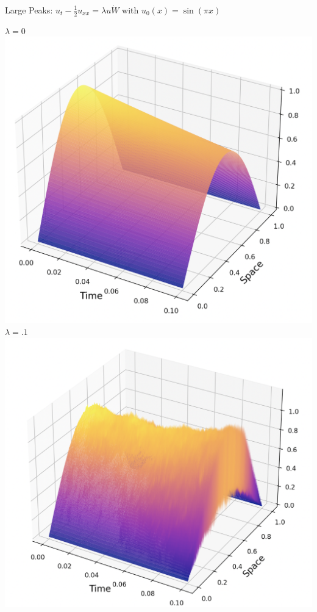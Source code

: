 \documentclass{beamer}%
\numberwithin{equation}{section}
\begin{document}
\begin{frame}{Large Peaks: $u_t - \frac{1}{2}u_{xx} = \lambda u \dot{W}$ with $u_0(x) = \sin(\pi x)$}
	\begin{center}
	$\lambda = 0$ \includegraphics[scale=.2]{lambda0} \quad  $\lambda = .1$ \includegraphics[scale=.2]{lambdasmall}
	

\end{center}
\end{frame}
\end{document}
